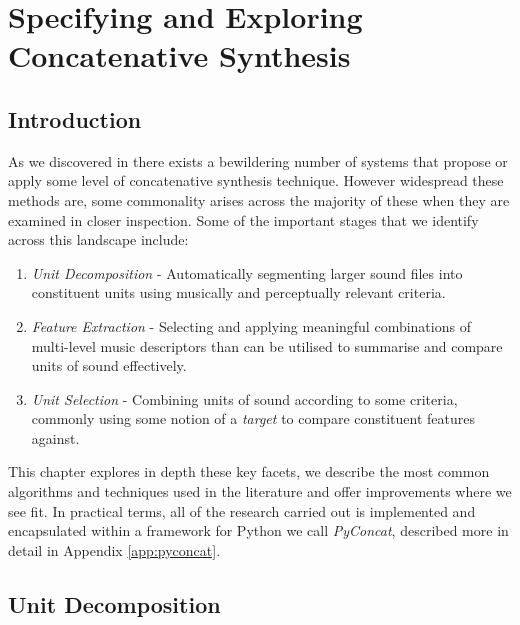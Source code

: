 \chapter{Specifying and Exploring Concatenative Synthesis}
\label{chap:pyconcat}

\section{Introduction}

As we discovered in  there exists a bewildering number of systems that propose or apply some level of concatenative synthesis technique. However widespread these methods are, some commonality arises across the majority of these when they are examined in closer inspection. Some of the important stages that we identify across this landscape include: 

\begin{enumerate}
  \item \textit{Unit Decomposition} - Automatically segmenting larger sound files into constituent units using musically and perceptually relevant criteria.
  \item \textit{Feature Extraction} - Selecting and applying meaningful combinations of multi-level music descriptors than can be utilised to summarise and compare units of sound effectively.
  \item \textit{Unit Selection} - Combining units of sound according to some criteria, commonly using some notion of a \textit{target} to compare constituent features against.  
\end{enumerate}

This chapter explores in depth these key facets, we describe the most common algorithms and techniques used in the literature and offer improvements where we see fit. In practical terms, all of the research carried out is implemented and encapsulated within a framework for Python we call \textit{PyConcat}, described more in detail in Appendix  \ref{app:pyconcat}. 

\section{Unit Decomposition}

